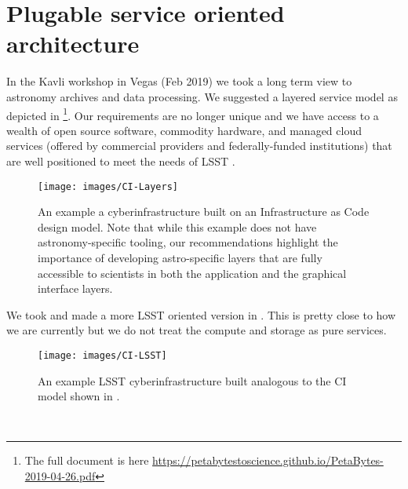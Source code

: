 
\section{Plugable service oriented architecture} \label{sec:arc}

In the Kavli workshop in Vegas (Feb 2019) we took a long term view to astronomy archives and data processing.
We suggested a layered service model as depicted in \footnote{The full document is here \url{https://petabytestoscience.github.io/PetaBytes-2019-04-26.pdf}}.
Our requirements are no longer unique and we have access to a wealth of open source \gls{software}, commodity hardware, and managed \gls{cloud} services (offered by commercial providers and federally-funded institutions) that are well positioned to meet the needs of \gls{LSST} \cite{2019AAS...23345706M, 2019AAS...23324505B}.


\begin{figure}
    \centering
    \texttt{[image: images/CI-Layers]}
    \caption{An example a \gls{cyberinfrastructure} built on an Infrastructure as Code design model. Note that while this example does not have astronomy-specific tooling, our recommendations highlight the importance of developing astro-specific layers that are fully accessible to scientists in both  the application  and the graphical interface layers. \label{fig:CI}}
\end{figure}


We took  and made a more \gls{LSST} oriented version in . This is pretty close to how we are currently but we do not treat the compute and storage as pure services.

\begin{figure}
    \centering
    \texttt{[image: images/CI-LSST]}
    \caption{An example \gls{LSST}  \gls{cyberinfrastructure} built analogous to the \gls{CI} model shown in .}
    \label{fig:CI-LSST}
\end{figure}\




